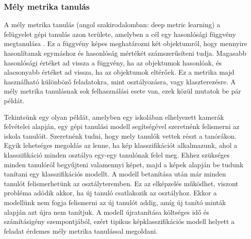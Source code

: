 \subsubsection{Mély metrika tanulás}
\label{sec:dml}


A mély metrika tanulás (angol szakirodalomban: deep metric learning) a felügyelet gépi tanulás azon területe, amelyben a cél egy hasonlósági függvény megtanulása \cite{kaya2019dmlsurvey}. Ez a függvény képes meghatározni két objektumról, hogy mennyire hasonlítanak egymáshoz és hasonlóság mértékét számszerűsíteni tudja. Magasabb hasonlósági értéket ad vissza a függvény, ha az objektumok hasonlóak, és alacsonyabb értéket ad vissza, ha az objektumok eltérőek. Ez a metrika majd használható különböző feladatokra, mint osztályozásra, vagy klaszterezésre. A mély metrika tanulásnak sok felhasználási esete van, ezek közül mutatok be pár példát.


Tekintsünk egy olyan példát, amelyben egy iskolában elhelyezett kamerák felvételei alapján, egy gépi tanulási modell segítségével szeretnénk felismerni az iskola tanulóit. Szeretnénk tudni, hogy mely tanulók vettek részt a tanórákon. Egyik lehetséges megoldás az lenne, ha kép klasszifikációt alkalmazunk, ahol a klasszifikáció minden osztálya egy-egy tanulónak felel meg. Ehhez szükséges minden tanulóról begyűjteni valamennyi képet, majd a képek alapján be tudunk tanítani egy klasszifikációs modellt. A modell betanítása után már minden tanulót felismerhetünk az osztályteremben. Ez az elképzelés működhet, viszont probléma adódik akkor, ha új tanuló csatlakozik az osztályhoz. Ekkor a modellünk nem fogja felismerni az új tanulót addig, amíg új tanító minták alapján azt újra nem tanítjuk. A modell újratanítása költséges idő és számításigény szempontjából, ezért tipikus képklasszifikációs modell helyett a feladat érdemes mély metrika tanulással megoldani.



